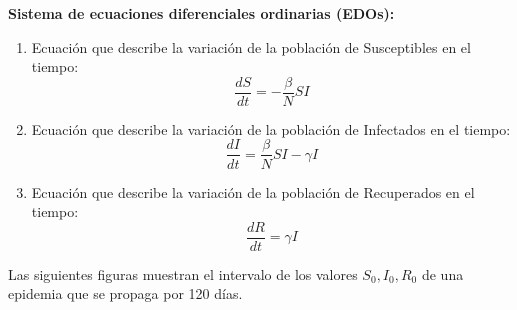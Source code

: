         \textbf{Sistema de ecuaciones diferenciales ordinarias (EDOs):}
        \begin{enumerate}
            
            \item  Ecuación que describe la variación de la población de Susceptibles en el tiempo:
               \[
               \frac{dS}{dt} = -\frac{\beta}{N} S I
               \]
            \item Ecuación que describe la variación de la población de Infectados en el tiempo:
                  \[
                  \frac{dI}{dt} = \frac{\beta}{N} S I - \gamma I
                  \]
            \item Ecuación que describe la variación de la población de Recuperados en el tiempo:
                \[
                \frac{dR}{dt} = \gamma I
                \]
               
        \end{enumerate}

        Las siguientes figuras muestran el intervalo de los valores $S_0,I_0,R_0$ de una epidemia que se propaga por 120 días. \\

